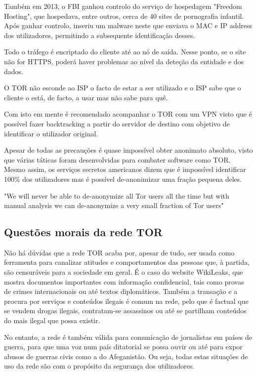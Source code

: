 \documentclass{llncs}
\begin{document}
\par Também em 2013, o FBI ganhou controlo do serviço de hospedagem "Freedom Hosting", que hospedava, entre outros, cerca de 40 sites de pornografia infantil. Após ganhar controlo, inseriu um malware neste que enviava o MAC e IP address dos utilizadores, permitindo a subsequente identificação desses. \cite{Free}

\par Todo o tráfego é encriptado do cliente até ao nó de saída. Nesse ponto, se o site não for HTTPS, poderá haver problemas ao nível da deteção da entidade e dos dados. 
\par O TOR não esconde ao ISP o facto de estar a ser utilizado e o ISP sabe que o cliente o está, de facto, a usar mas não sabe para quê.
\par Com isto em mente é recomendado acompanhar o TOR com um VPN visto que é possível fazer backtracking a partir do servidor de destino com objetivo de identificar o utilizador original.

\par Apesar de todas as precauções é quase impossível obter anonimato absoluto, visto que várias táticas foram desenvolvidas para combater software como TOR. Mesmo assim, os serviços secretos americanos dizem que é impossível identificar 100\% dos utilizadores mas é possível de-anonimizar uma fração pequena deles.


"We will never be able to de-anonymize all Tor users all the time but with manual analysis we can de-anonymize a very small fraction of Tor users"
\cite{Ed}

\subsection{Questões morais da rede TOR}
\hspace{3mm} Não há dúvidas que a rede TOR acaba por, apesar de tudo, ser usada como ferramenta para canalizar atitudes e comportamentos das pessoas que, à partida, são censuráveis para a sociedade em geral. É o caso do website WikiLeaks, que mostra documentos importantes com informação confidencial, tais como provas de crimes internacionais ou até textos diplomáticos. Também a transação e a procura por serviços e conteúdos ilegais é comum na rede, pelo que é factual que se vendem drogas ilegais, contratam-se assassinos ou até se partilham conteúdos do mais ilegal que possa existir.

\par No entanto, a rede é também válida para comunicação de jornalistas em países de guerra, para que uma voz num país ditatorial se possa ouvir ou até para expor abusos de guerras civis como a do Afeganistão. Ou seja, todas estas situações de uso da rede são com o propósito da segurança dos utilizadores.
\end{document}
